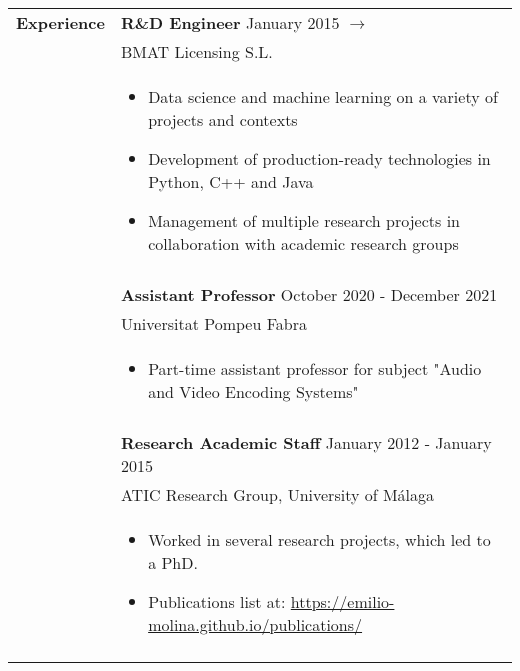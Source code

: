 \documentclass[letterpaper,11pt,oneside]{article}
\begin{document}
\small
\noindent \begin{tabularx}{\linewidth}{l X}
 \Large{\textbf{Experience}}    & \textbf{R\&D Engineer} \hfill January 2015 $\rightarrow$\\
     & BMAT Licensing S.L.\\
     & \vspace{-0.1cm}\begin{itemize}[nosep,noitemsep,topsep=0pt,partopsep=0pt]
        \item Data science and machine learning on a variety of projects and contexts
         \item Development of production-ready technologies in Python, C++ and Java
         \item Management of multiple research projects in collaboration with academic research groups
     \end{itemize}\\
     & \\
     & \textbf{Assistant Professor} \hfill October 2020 - December 2021\\
     & Universitat Pompeu Fabra\\
     & \vspace{-0.1cm}\begin{itemize}[nosep,noitemsep,topsep=0pt,partopsep=0pt]
         \item Part-time assistant professor for subject "Audio and Video Encoding Systems"
     \end{itemize}\\
     & \\
     & \textbf{Research Academic Staff} \hfill January 2012 - January 2015\\
     & ATIC Research Group, University of Málaga\\
     & \vspace{-0.1cm}\begin{itemize}[nosep,noitemsep,topsep=0pt,partopsep=0pt]
         \item Worked in several research projects, which led to a PhD.
         \item Publications list at: \url{https://emilio-molina.github.io/publications/}
     \end{itemize}\\
     \\
\end{tabularx}
\end{document}
